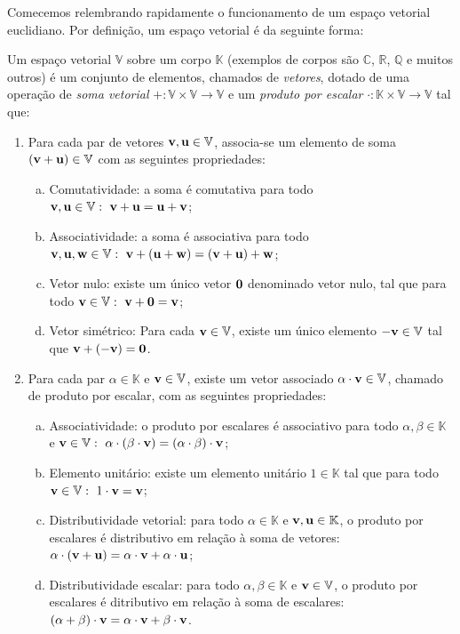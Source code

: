 Comecemos relembrando rapidamente o funcionamento de um espaço vetorial euclidiano. Por definição, um espaço vetorial é da seguinte forma:
\begin{definition}
\label{def: vector space}
    Um espaço vetorial $\mathbb{V}$ sobre um corpo $\mathbb{K}$ (exemplos de corpos são $\mathbb{C}$, $\mathbb{R}$, $\mathbb{Q}$ e muitos outros) é um conjunto de elementos, chamados de \textit{vetores}, dotado de uma operação de \textit{soma vetorial} $+:\mathbb{V}\times\mathbb{V}\to\mathbb{V}$ e um \textit{produto por escalar} $\cdot: \mathbb{K}\times\mathbb{V}\to\mathbb{V}$ tal que:
    \begin{enumerate}
        \item Para cada par de vetores $\vb{v},\vb{u}\in\mathbb{V}$, associa-se um elemento de soma $(\vb{v} + \vb{u}) \in \mathbb{V}$ com as seguintes propriedades:
            \begin{enumerate}[(a)]
                \item Comutatividade: a soma é comutativa para todo $\vb{v},\vb{u}\in\mathbb{V}:\ \vb{v} + \vb{u} = \vb{u} + \vb{v}$;
                \item Associatividade: a soma é associativa para todo $\vb{v},\vb{u},\vb{w}\in\mathbb{V}:\ \vb{v} + (\vb{u} + \vb{w}) = (\vb{v} + \vb{u}) + \vb{w}$;
                \item Vetor nulo: existe um único vetor $\vb{0}$ denominado vetor nulo, tal que para todo $\vb{v}\in \mathbb{V}:\ \vb{v} + \vb{0} = \vb{v}$;
                \item Vetor simétrico: Para cada $\vb{v}\in\mathbb{V}$, existe um único elemento $-\vb{v}\in\mathbb{V}$ tal que $\vb{v} + (-\vb{v}) = \vb{0}$.
            \end{enumerate}
        \item Para cada par $\alpha \in\mathbb{K}$ e $\vb{v}\in\mathbb{V}$, existe um vetor associado $\alpha\cdot\vb{v}\in\mathbb{V}$, chamado de produto por escalar, com as seguintes propriedades:
            \begin{enumerate}[(a)]
                \item Associatividade: o produto por escalares é associativo para todo $\alpha,\beta\in\mathbb{K}$ e $\vb{v}\in\mathbb{V}:\ \alpha\cdot(\beta\cdot\vb{v}) = (\alpha\cdot\beta)\cdot\vb{v}$;
                \item Elemento unitário: existe um elemento unitário $1\in\mathbb{K}$ tal que para todo $\vb{v}\in\mathbb{V}:\ 1\cdot\vb{v} = \vb{v}$;
                \item Distributividade vetorial: para todo $\alpha\in\mathbb{K}$ e $\vb{v},\vb{u}\in\mathbb{K}$, o produto por escalares é distributivo em relação à soma de vetores: $\alpha\cdot(\vb{v} + \vb{u}) = \alpha\cdot\vb{v} + \alpha\cdot\vb{u}$;
                \item Distributividade escalar: para todo $\alpha,\beta\in\mathbb{K}$ e $\vb{v}\in\mathbb{V}$, o produto por escalares é ditributivo em relação à soma de escalares: $(\alpha + \beta)\cdot\vb{v} = \alpha\cdot\vb{v} + \beta\cdot\vb{v}$.
            \end{enumerate}
    \end{enumerate}
\end{definition}

